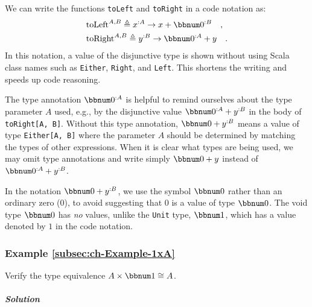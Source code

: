 \noindent We can write the functions \lstinline!toLeft! and \lstinline!toRight!
in a code notation as:
\begin{align*}
 & \text{toLeft}^{A,B}\triangleq x^{:A}\rightarrow x+\bbnum 0^{:B}\quad,\\
 & \text{toRight}^{A,B}\triangleq y^{:B}\rightarrow\bbnum 0^{:A}+y\quad.
\end{align*}
In this notation, a value of the disjunctive type is shown without
using Scala class names such as \lstinline!Either!, \lstinline!Right!,
and \lstinline!Left!. This shortens the writing and speeds up code
reasoning. 

The type annotation $\bbnum 0^{:A}$ is helpful to remind ourselves
about the type parameter $A$ used, e.g., by the disjunctive value
$\bbnum 0^{:A}+y^{:B}$ in the body of \lstinline!toRight[A, B]!.
Without this type annotation, $\bbnum 0+y^{:B}$ means a value of
type \lstinline!Either[A, B]! where the parameter $A$ should be
determined by matching the types of other expressions. When it is
clear what types are being used, we may omit type annotations and
write simply $\bbnum 0+y$ instead of $\bbnum 0^{:A}+y^{:B}$.

In the notation $\bbnum 0+y^{:B}$, we use the symbol $\bbnum 0$
rather than an ordinary zero ($0$), to avoid suggesting that $0$
is a value of type $\bbnum 0$. The void type $\bbnum 0$ has \emph{no}
values, unlike the \lstinline!Unit! type, $\bbnum 1$, which has
a value denoted by $1$ in the code notation.

\subsubsection{Example \label{subsec:ch-Example-1xA}\ref{subsec:ch-Example-1xA}}

Verify the type equivalence $A\times\bbnum 1\cong A$.

\subparagraph{Solution}

